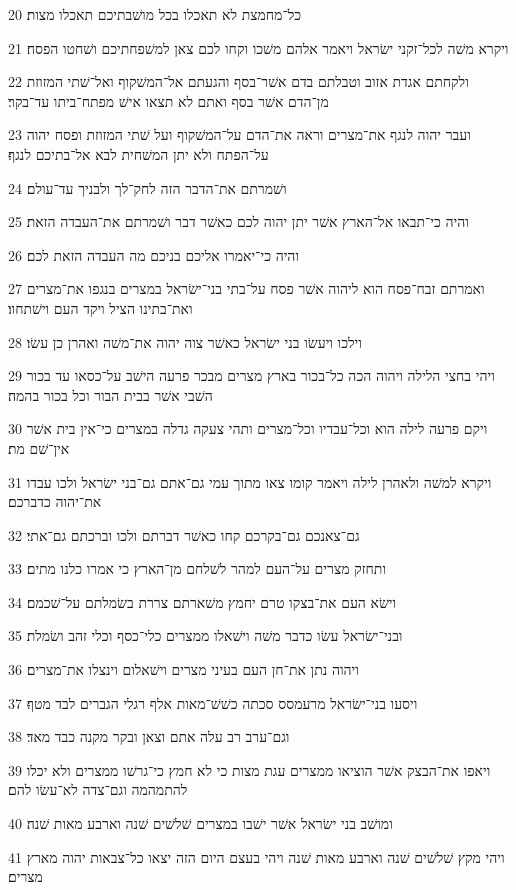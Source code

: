 \par 20 כל־מחמצת לא תאכלו בכל מושׁבתיכם תאכלו מצות׃
\par 21 ויקרא משׁה לכל־זקני ישׂראל ויאמר אלהם משׁכו וקחו לכם צאן למשׁפחתיכם ושׁחטו הפסח׃
\par 22 ולקחתם אגדת אזוב וטבלתם בדם אשׁר־בסף והגעתם אל־המשׁקוף ואל־שׁתי המזוזת מן־הדם אשׁר בסף ואתם לא תצאו אישׁ מפתח־ביתו עד־בקר׃
\par 23 ועבר יהוה לנגף את־מצרים וראה את־הדם על־המשׁקוף ועל שׁתי המזוזת ופסח יהוה על־הפתח ולא יתן המשׁחית לבא אל־בתיכם לנגף׃
\par 24 ושׁמרתם את־הדבר הזה לחק־לך ולבניך עד־עולם׃
\par 25 והיה כי־תבאו אל־הארץ אשׁר יתן יהוה לכם כאשׁר דבר ושׁמרתם את־העבדה הזאת׃
\par 26 והיה כי־יאמרו אליכם בניכם מה העבדה הזאת לכם׃
\par 27 ואמרתם זבח־פסח הוא ליהוה אשׁר פסח על־בתי בני־ישׂראל במצרים בנגפו את־מצרים ואת־בתינו הציל ויקד העם וישׁתחוו׃
\par 28 וילכו ויעשׂו בני ישׂראל כאשׁר צוה יהוה את־משׁה ואהרן כן עשׂו׃
\par 29 ויהי בחצי הלילה ויהוה הכה כל־בכור בארץ מצרים מבכר פרעה הישׁב על־כסאו עד בכור השׁבי אשׁר בבית הבור וכל בכור בהמה׃
\par 30 ויקם פרעה לילה הוא וכל־עבדיו וכל־מצרים ותהי צעקה גדלה במצרים כי־אין בית אשׁר אין־שׁם מת׃
\par 31 ויקרא למשׁה ולאהרן לילה ויאמר קומו צאו מתוך עמי גם־אתם גם־בני ישׂראל ולכו עבדו את־יהוה כדברכם׃
\par 32 גם־צאנכם גם־בקרכם קחו כאשׁר דברתם ולכו וברכתם גם־אתי׃
\par 33 ותחזק מצרים על־העם למהר לשׁלחם מן־הארץ כי אמרו כלנו מתים׃
\par 34 וישׂא העם את־בצקו טרם יחמץ משׁארתם צררת בשׂמלתם על־שׁכמם׃
\par 35 ובני־ישׂראל עשׂו כדבר משׁה וישׁאלו ממצרים כלי־כסף וכלי זהב ושׂמלת׃
\par 36 ויהוה נתן את־חן העם בעיני מצרים וישׁאלום וינצלו את־מצרים׃
\par 37 ויסעו בני־ישׂראל מרעמסס סכתה כשׁשׁ־מאות אלף רגלי הגברים לבד מטף׃
\par 38 וגם־ערב רב עלה אתם וצאן ובקר מקנה כבד מאד׃
\par 39 ויאפו את־הבצק אשׁר הוציאו ממצרים עגת מצות כי לא חמץ כי־גרשׁו ממצרים ולא יכלו להתמהמה וגם־צדה לא־עשׂו להם׃
\par 40 ומושׁב בני ישׂראל אשׁר ישׁבו במצרים שׁלשׁים שׁנה וארבע מאות שׁנה׃
\par 41 ויהי מקץ שׁלשׁים שׁנה וארבע מאות שׁנה ויהי בעצם היום הזה יצאו כל־צבאות יהוה מארץ מצרים׃
